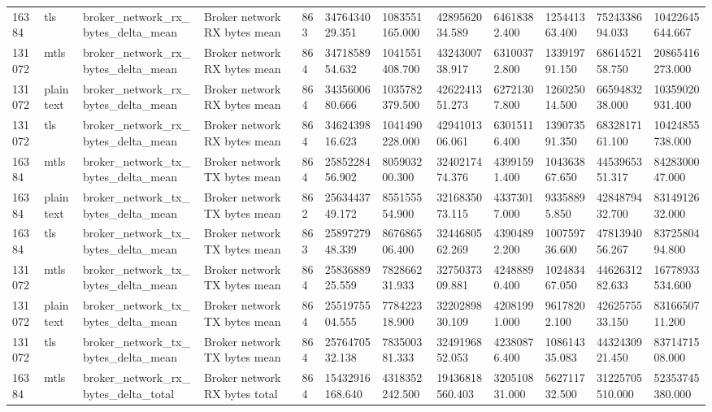 \begin{longtable}{llllllllllll}
16384 & tls & broker\_network\_rx\_bytes\_delta\_mean & Broker network RX bytes mean & 863 & 3476434029.351 & 1083551165.000 & 4289562034.589 & 64618382.400 & 125441363.400 & 7524338694.033 & 10422645644.667 \\
131072 & mtls & broker\_network\_rx\_bytes\_delta\_mean & Broker network RX bytes mean & 864 & 3471858954.632 & 1041551408.700 & 4324300738.917 & 63100372.800 & 133919791.150 & 6861452158.750 & 20865416273.000 \\
131072 & plaintext & broker\_network\_rx\_bytes\_delta\_mean & Broker network RX bytes mean & 864 & 3435600680.666 & 1035782379.500 & 4262241351.273 & 62721307.800 & 126025014.500 & 6659483238.000 & 10359020931.400 \\
131072 & tls & broker\_network\_rx\_bytes\_delta\_mean & Broker network RX bytes mean & 864 & 3462439816.623 & 1041490228.000 & 4294101306.061 & 63015116.400 & 139073591.350 & 6832817161.100 & 10424855738.000 \\
16384 & mtls & broker\_network\_tx\_bytes\_delta\_mean & Broker network TX bytes mean & 864 & 2585228456.902 & 805903200.300 & 3240217474.376 & 43991591.400 & 104363867.650 & 4453965351.317 & 8428300047.000 \\
16384 & plaintext & broker\_network\_tx\_bytes\_delta\_mean & Broker network TX bytes mean & 862 & 2563443749.172 & 855155554.900 & 3216835073.115 & 43373017.000 & 93358895.850 & 4284879432.700 & 8314912632.000 \\
16384 & tls & broker\_network\_tx\_bytes\_delta\_mean & Broker network TX bytes mean & 863 & 2589727948.339 & 867686506.400 & 3244680562.269 & 43904892.200 & 100759736.600 & 4781394056.267 & 8372580494.800 \\
131072 & mtls & broker\_network\_tx\_bytes\_delta\_mean & Broker network TX bytes mean & 864 & 2583688925.559 & 782866231.933 & 3275037309.881 & 42488890.400 & 102483467.050 & 4462631282.633 & 16778933534.600 \\
131072 & plaintext & broker\_network\_tx\_bytes\_delta\_mean & Broker network TX bytes mean & 864 & 2551975504.555 & 778422318.900 & 3220289830.109 & 42081991.000 & 96178202.100 & 4262575533.150 & 8316650711.200 \\
131072 & tls & broker\_network\_tx\_bytes\_delta\_mean & Broker network TX bytes mean & 864 & 2576470532.138 & 783500381.333 & 3249196852.053 & 42380876.400 & 108614335.083 & 4432430921.450 & 8371471508.000 \\
16384 & mtls & broker\_network\_rx\_bytes\_delta\_total & Broker network RX bytes total & 864 & 15432916168.640 & 4318352242.500 & 19436818560.403 & 320510831.000 & 562711732.500 & 31225705510.000 & 52353745380.000 \\

\end{longtable}
